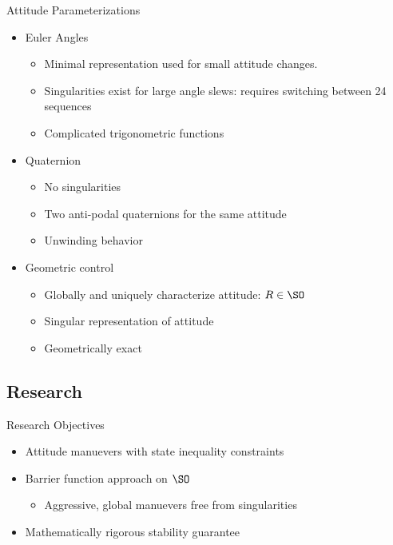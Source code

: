 \documentclass[11pt,professionalfonts]{beamer}
\begin{document}
\begin{frame}{Attitude Parameterizations}
	\begin{itemize}
		\item Euler Angles
		\begin{itemize}
			\item Minimal representation used for small attitude changes.
			\item Singularities exist for large angle slews: requires switching between 24 sequences
			\item Complicated trigonometric functions
		\end{itemize}
		\pause
		\item Quaternion 
		\begin{itemize}
			\item No singularities
			\item Two anti-podal quaternions for the same attitude
			\item Unwinding behavior 
		\end{itemize}
		\pause
		\item Geometric control
		\begin{itemize}
			\item Globally and uniquely characterize attitude: \( R \in \SO \)
			\item Singular representation of attitude 
			\item Geometrically exact
		\end{itemize}
	\end{itemize}
	
\end{frame}

\subsection{Research}

\begin{frame}{Research Objectives}
\begin{itemize}
	\item Attitude manuevers with state inequality constraints
	\item Barrier function approach on \( \SO \) 
	\begin{itemize}
		\item Aggressive, global manuevers free from singularities
	\end{itemize}
	\item Mathematically rigorous stability guarantee
\end{itemize}
\end{frame}
\end{document}
